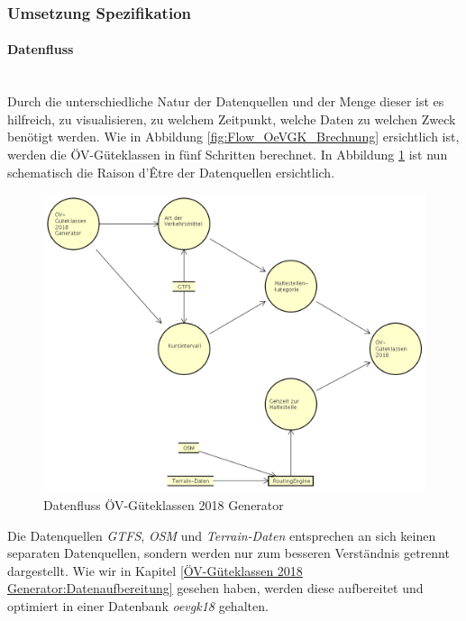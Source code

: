 \subsubsection{Umsetzung Spezifikation}
\label{ÖV-Güteklassen 2018 Generator:Umsetzung Spezifikation}

\paragraph{Datenfluss}~\\
Durch die unterschiedliche Natur der Datenquellen und der Menge dieser ist es hilfreich, zu visualisieren, zu welchem Zeitpunkt, welche Daten zu welchen Zweck benötigt werden.
Wie in Abbildung \ref{fig:Flow_OeVGK_Brechnung} ersichtlich ist, werden die \acs{ÖV}-Güteklassen in fünf Schritten berechnet. 
In Abbildung \ref{fig:dataflow_OeV-Gueteklassen_2018_Generator} ist nun schematisch die Raison d’Être der Datenquellen ersichtlich.

\begin{figure}[ht]
    \centering
    \includegraphics[width=1.0\linewidth]{projectdoc/img/dataflow_OeV-Gueteklassen_2018_Generator.png}
    \caption[Datenfluss ÖV-Güteklassen 2018 Generator]{Datenfluss ÖV-Güteklassen 2018 Generator}
    \label{fig:dataflow_OeV-Gueteklassen_2018_Generator}
\end{figure}

Die Datenquellen \emph{GTFS}, \emph{OSM} und \emph{Terrain-Daten} entsprechen an sich keinen separaten Datenquellen, sondern werden nur zum besseren Verständnis getrennt dargestellt.
Wie wir in Kapitel \ref{ÖV-Güteklassen 2018 Generator:Datenaufbereitung} gesehen haben, werden diese aufbereitet und optimiert in einer Datenbank \emph{oevgk18} gehalten.

